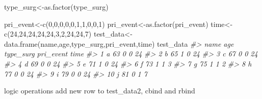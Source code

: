 \documentclass[
]{article}
\newenvironment{Shaded}{\begin{snugshade}}{\end{snugshade}}
\newcommand{\CommentTok}[1]{\textcolor[rgb]{0.56,0.35,0.01}{\textit{#1}}}
\newcommand{\DecValTok}[1]{\textcolor[rgb]{0.00,0.00,0.81}{#1}}
\newcommand{\FunctionTok}[1]{\textcolor[rgb]{0.00,0.00,0.00}{#1}}
\newcommand{\NormalTok}[1]{#1}
\newcommand{\OtherTok}[1]{\textcolor[rgb]{0.56,0.35,0.01}{#1}}
\begin{document}
\begin{Shaded}
\begin{Highlighting}[]
\NormalTok{type\_surg}\OtherTok{\textless{}{-}}\FunctionTok{as.factor}\NormalTok{(type\_surg)}

\NormalTok{pri\_event}\OtherTok{\textless{}{-}}\FunctionTok{c}\NormalTok{(}\DecValTok{0}\NormalTok{,}\DecValTok{0}\NormalTok{,}\DecValTok{0}\NormalTok{,}\DecValTok{0}\NormalTok{,}\DecValTok{0}\NormalTok{,}\DecValTok{1}\NormalTok{,}\DecValTok{1}\NormalTok{,}\DecValTok{0}\NormalTok{,}\DecValTok{0}\NormalTok{,}\DecValTok{1}\NormalTok{)}
\NormalTok{pri\_event}\OtherTok{\textless{}{-}}\FunctionTok{as.factor}\NormalTok{(pri\_event)}
\NormalTok{time}\OtherTok{\textless{}{-}}\FunctionTok{c}\NormalTok{(}\DecValTok{24}\NormalTok{,}\DecValTok{24}\NormalTok{,}\DecValTok{24}\NormalTok{,}\DecValTok{24}\NormalTok{,}\DecValTok{24}\NormalTok{,}\DecValTok{3}\NormalTok{,}\DecValTok{2}\NormalTok{,}\DecValTok{24}\NormalTok{,}\DecValTok{24}\NormalTok{,}\DecValTok{7}\NormalTok{)}
\NormalTok{test\_data}\OtherTok{\textless{}{-}} \FunctionTok{data.frame}\NormalTok{(name,age,type\_surg,pri\_event,time)}
\NormalTok{test\_data}
\CommentTok{\#\textgreater{}    name age type\_surg pri\_event time}
\CommentTok{\#\textgreater{} 1     a  63         0         0   24}
\CommentTok{\#\textgreater{} 2     b  65         1         0   24}
\CommentTok{\#\textgreater{} 3     c  67         0         0   24}
\CommentTok{\#\textgreater{} 4     d  69         0         0   24}
\CommentTok{\#\textgreater{} 5     e  71         1         0   24}
\CommentTok{\#\textgreater{} 6     f  73         1         1    3}
\CommentTok{\#\textgreater{} 7     g  75         1         1    2}
\CommentTok{\#\textgreater{} 8     h  77         0         0   24}
\CommentTok{\#\textgreater{} 9     i  79         0         0   24}
\CommentTok{\#\textgreater{} 10    j  81         0         1    7}
\end{Highlighting}
\end{Shaded}

logic operations
add new row to test\_data2, cbind and rbind
\end{document}
